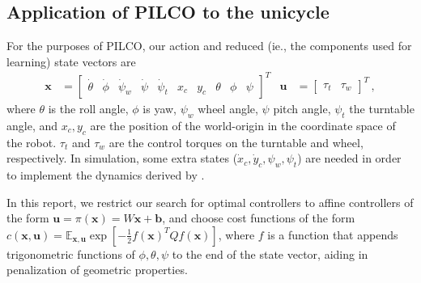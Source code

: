 \documentclass[main.tex]{subfiles}
\begin{document}
	\subsection{Application of PILCO to the unicycle}
		For the purposes of PILCO, our action and reduced (ie., the components used for learning)  state vectors are
		\begin{align}
			\bm{x} &= \begin{bmatrix}
				\dot\theta & \dot\phi &\dot\psi_w & \dot\psi & \dot\psi_t &
				x_c & y_c &
				\theta &
				\phi & \psi
			\end{bmatrix}^T &
			\bm{u} &= \begin{bmatrix}
				\tau_t & \tau_w
			\end{bmatrix}^T\,,
		\end{align}
		where $\theta$ is the roll angle, $\phi$ is yaw, $\psi_w$ wheel angle,
		$\psi$ pitch angle, $\psi_t$ the turntable angle, and $x_c, y_c$ are the position of the world-origin in the coordinate space of the robot.
		$\tau_t$ and $\tau_w$ are the control torques on the turntable and wheel, respectively.
		In simulation, some extra states ($\dot{x}_c, \dot{y}_c, \psi_w, \psi_t$) are needed in order to implement the dynamics derived by \citeauthor{forster} \cite{forster}.

		In this report, we restrict our search for optimal controllers to affine controllers of the form
		$\bm{u} = \pi(\bm{x}) = W\bm{x} + \bm{b}$, and choose cost functions of the form
		$c(\bm{x}, \bm{u}) = \mathbb{E}_{\bm{x}, \bm{u}} \exp\left[-\frac{1}{2} f(\bm{x})^T Q f(\bm{x})\right]$, where $f$ is a function that appends trigonometric functions of $\phi, \theta, \psi$ to the end of the state vector, aiding in penalization of geometric properties.

\bib
\end{document}
